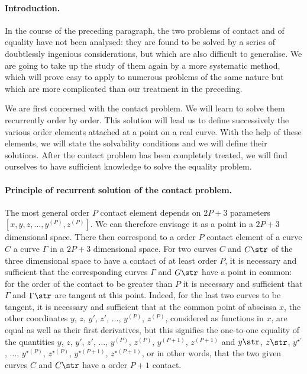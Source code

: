 \paragraph{Introduction.}
\label{sec:15}
In the course of the preceding paragraph, the two problems of contact and of equality have not been analysed: they are found to be solved by a series of doubtlessly ingenious considerations, but which are also difficult to generalise. We are going to take up the study of them again by a more systematic method, which will prove easy to apply to numerous problems of the same nature but which are more complicated than our treatment in the preceding.

We are first concerned with the contact problem. We will learn to solve them recurrently order by order. This solution will lead us to define successively the various order elements attached at a point on a real curve. With the help of these elements, we will state the solvability conditions and we will define their solutions. After the contact problem has been completely treated, we will find ourselves to have sufficient knowledge to solve the equality problem.

\paragraph{Principle of recurrent solution of the contact problem.}
\label{sec:16}
The most general order $P$ contact element depends on $2P+3$ parameters $[x,y,z,\dots,y^{(P)},z^{(P)}]$. We can therefore envisage it as a point in a $2P+3$ dimensional space. There then correspond to a order $P$ contact element of a curve $C$ a curve $\Gamma$ in a $2P+3$ dimensional space. For two curves $C$ and $C\str$ of the three dimensional space to have a contact of at least order $P$, it is necessary and sufficient that the corresponding curves $\Gamma$ and $G\str$ have a point in common: for the order of the contact to be greater than $P$ it is necessary and sufficient that $\Gamma$ and $\Gamma\str$ are tangent at this point. Indeed, for the last two curves to be tangent, it is necessary and sufficient that at the common point of abscissa $x$, the other coordinates $y$, $z$, $y'$, $z'$, $\dots$, $y^{(P)}$, $z^{(P)}$, considered as functions in $x$, are equal as well as their first derivatives, but this signifies the one-to-one equality of the quantities $y$, $z$, $y'$, $z'$, $\dots$, $y^{(P)}$, $z^{(P)}$, $y^{(P+1)}$, $z^{(P+1)}$ and $y\str$, $z\str$, $y^{\star\prime}$, $\dots$, $y^{\star(P)}$, $z^{\star(P)}$, $y^{\star(P+1)}$, $z^{\star(P+1)}$, or in other words, that the two given curves $C$ and $C\str$ have a order $P+1$ contact.

